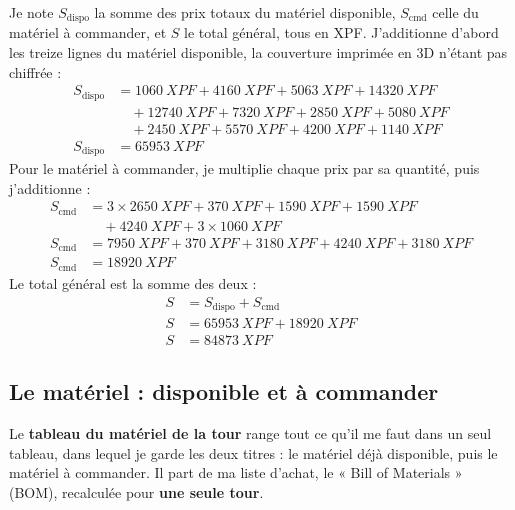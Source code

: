 \begin{demonstration}
Je note $S_{\text{dispo}}$ la somme des prix totaux du matériel disponible, $S_{\text{cmd}}$ celle du matériel à commander, et $S$ le total général, tous en XPF. J'additionne d'abord les treize lignes du matériel disponible, la couverture imprimée en 3D n'étant pas chiffrée :
\begin{align*}
S_{\text{dispo}} &= \qty{1060}{XPF} + \qty{4160}{XPF} + \qty{5063}{XPF} + \qty{14320}{XPF}\\
&\quad + \qty{12740}{XPF} + \qty{7320}{XPF} + \qty{2850}{XPF} + \qty{5080}{XPF}\\
&\quad + \qty{2450}{XPF} + \qty{5570}{XPF} + \qty{4200}{XPF} + \qty{1140}{XPF}\\
S_{\text{dispo}} &= \qty{65953}{XPF}
\end{align*}
Pour le matériel à commander, je multiplie chaque prix par sa quantité, puis j'additionne :
\begin{align*}
S_{\text{cmd}} &= 3 \times \qty{2650}{XPF} + \qty{370}{XPF} + \qty{1590}{XPF} + \qty{1590}{XPF}\\
&\quad + \qty{4240}{XPF} + 3 \times \qty{1060}{XPF}\\
S_{\text{cmd}} &= \qty{7950}{XPF} + \qty{370}{XPF} + \qty{3180}{XPF} + \qty{4240}{XPF} + \qty{3180}{XPF}\\
S_{\text{cmd}} &= \qty{18920}{XPF}
\end{align*}
Le total général est la somme des deux :
\begin{align*}
S &= S_{\text{dispo}} + S_{\text{cmd}}\\
S &= \qty{65953}{XPF} + \qty{18920}{XPF}\\
S &= \qty{84873}{XPF}
\end{align*}
\end{demonstration}

\subsection{Le matériel : disponible et à commander}

Le \textbf{tableau du matériel de la tour} range tout ce qu'il me faut dans un seul tableau, dans lequel je garde les deux titres : le matériel déjà disponible, puis le matériel à commander. Il part de ma liste d'achat, le « Bill of Materials » (BOM), recalculée pour \textbf{une seule tour}.

